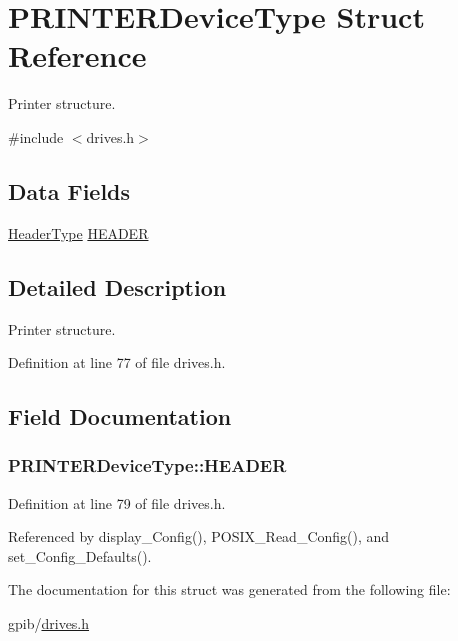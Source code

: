 \hypertarget{structPRINTERDeviceType}{}\section{P\+R\+I\+N\+T\+E\+R\+Device\+Type Struct Reference}
\label{structPRINTERDeviceType}


Printer structure.  




{\ttfamily \#include $<$drives.\+h$>$}

\subsection*{Data Fields}
\begin{DoxyCompactItemize}
\item 
\hyperlink{structHeaderType}{Header\+Type} \hyperlink{structPRINTERDeviceType_ac1ae5b29520f726e4aaab0232ecd6463}{H\+E\+A\+D\+ER}
\end{DoxyCompactItemize}


\subsection{Detailed Description}
Printer structure. 

Definition at line 77 of file drives.\+h.



\subsection{Field Documentation}
\subsubsection[{\texorpdfstring{H\+E\+A\+D\+ER}{HEADER}}]{ P\+R\+I\+N\+T\+E\+R\+Device\+Type\+::\+H\+E\+A\+D\+ER}\hypertarget{structPRINTERDeviceType_ac1ae5b29520f726e4aaab0232ecd6463}{}\label{structPRINTERDeviceType_ac1ae5b29520f726e4aaab0232ecd6463}


Definition at line 79 of file drives.\+h.



Referenced by display\+\_\+\+Config(), P\+O\+S\+I\+X\+\_\+\+Read\+\_\+\+Config(), and set\+\_\+\+Config\+\_\+\+Defaults().



The documentation for this struct was generated from the following file\+:\begin{DoxyCompactItemize}
\item 
gpib/\hyperlink{drives_8h}{drives.\+h}\end{DoxyCompactItemize}
